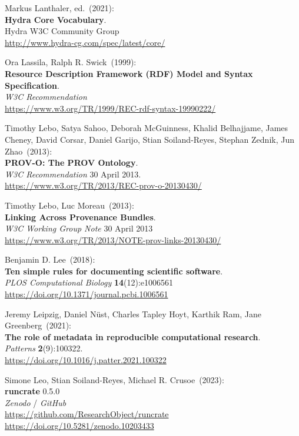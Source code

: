 \begin{thebibliography}{9}
Markus Lanthaler, ed.~(2021): \\
\textbf{Hydra Core Vocabulary}.\\
Hydra W3C Community Group\\
\url{http://www.hydra-cg.com/spec/latest/core/} 

Ora Lassila, Ralph R. Swick~(1999): \\
\textbf{Resource {Description Framework} ({RDF}) {Model} and {Syntax Specification}}. \\
\emph{W3C Recommendation}\\
\url{https://www.w3.org/TR/1999/REC-rdf-syntax-19990222/}  

Timothy Lebo, Satya Sahoo, Deborah McGuinness, Khalid Belhajjame, 
James Cheney, David Corsar, Daniel Garijo, Stian Soiland-Reyes, 
Stephan Zednik, Jun Zhao~(2013): \\
\textbf{PROV-O: The PROV Ontology}.\\
\emph{W3C Recommendation} 30 April 2013.\\
\url{https://www.w3.org/TR/2013/REC-prov-o-20130430/}

Timothy Lebo, Luc Moreau~(2013): \\
\textbf{Linking {Across Provenance Bundles}}.\\
\emph{W3C Working Group Note} 30 April 2013 \\
\url{https://www.w3.org/TR/2013/NOTE-prov-links-20130430/}

Benjamin D. Lee~(2018):\\
\textbf{Ten simple rules for documenting scientific software}.\\
\emph{PLOS Computational Biology} \textbf{14}(12):e1006561\\
\url{https://doi.org/10.1371/journal.pcbi.1006561}

Jeremy Leipzig, Daniel Nüst, Charles Tapley Hoyt, Karthik Ram,
Jane Greenberg~(2021): \\
\textbf{The role of metadata in reproducible computational research}.\\
\emph{Patterns} \textbf{2}(9):100322.\\
\url{https://doi.org/10.1016/j.patter.2021.100322}

Simone Leo, Stian Soiland-Reyes, Michael R. Crusoe~(2023): \\
\textbf{runcrate} 0.5.0\\
\emph{Zenodo} / \emph{GitHub}\\
\url{https://github.com/ResearchObject/runcrate}\\
\url{https://doi.org/10.5281/zenodo.10203433}


\end{thebibliography}
